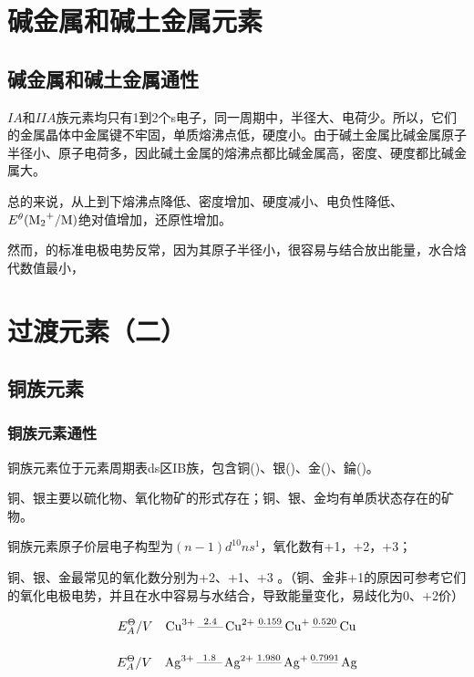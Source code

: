 \documentclass[a4paper,UTF8]{article}
\begin{document}
\section{碱金属和碱土金属元素}

\subsection{碱金属和碱土金属通性}

$IA$和$IIA$族元素均只有1到2个s电子，同一周期中，半径大、电荷少。所以，它们的金属晶体中金属键不牢固，单质熔沸点低，硬度小。由于碱土金属比碱金属原子半径小、原子电荷多，因此碱土金属的熔沸点都比碱金属高，密度、硬度都比碱金属大。

总的来说，从上到下熔沸点降低、密度增加、硬度减小、电负性降低、$E^{\theta}(\ce{M2+}/\ce{M})$绝对值增加，还原性增加。

然而，的标准电极电势反常，因为其原子半径小，很容易与结合放出能量，水合焓代数值最小，



\section{过渡元素（二）}

\subsection{铜族元素}

\subsubsection{铜族元素通性}

铜族元素位于元素周期表ds区IB族，包含铜()、银()、金()、錀()。

铜、银主要以硫化物、氧化物矿的形式存在；铜、银、金均有单质状态存在的矿物。

铜族元素原子价层电子构型为$(n-1)d^{10}ns^{1}$，氧化数有+1，+2，+3；

铜、银、金最常见的氧化数分别为+2、+1、+3 。（铜、金非+1的原因可参考它们的氧化电极电势，并且在水中容易与水结合，导致能量变化，易歧化为0、+2价）

$$ E^{\Theta}_{A}/V \quad \ce{Cu^{3+} \overset{2.4}{\text{------}} Cu^{2+} \overset{0.159}{\underset{}{\text{------}}} Cu+ \overset{0.520}{\underset{}{\text{------}}} Cu}$$

$$ E^{\Theta}_{A}/V  \quad \ce{Ag^{3+} \overset{1.8}{\underset{}{\text{------}}} Ag^{2+} \overset{1.980}{\underset{}{\text{------}}} Ag+ \overset{0.7991}{\underset{}{\text{------}}} Ag} $$
\end{document}
